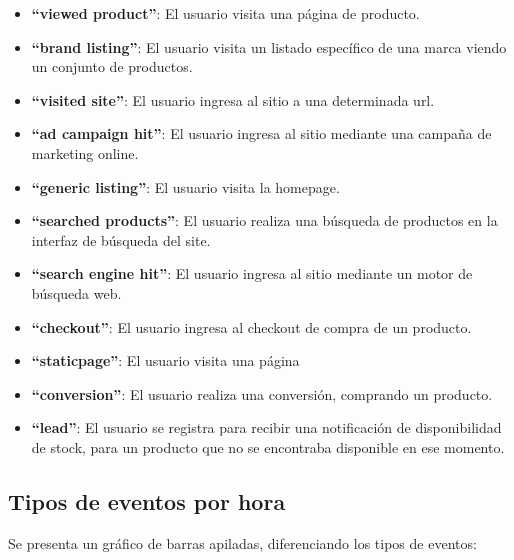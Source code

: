 \documentclass[a4paper ,12pt]{article}
\begin{document}
\begin{itemize}
	
	\item \textbf{“viewed product”}: El usuario visita una página de producto.
	
	\item \textbf{“brand listing”}: El usuario visita un listado específico de una marca viendo un conjunto de productos.
	
	\item \textbf{“visited site”}: El usuario ingresa al sitio a una determinada url.
	
	\item \textbf{“ad campaign hit”}: El usuario ingresa al sitio mediante una campaña de marketing online.
	
	\item \textbf{“generic listing”}: El usuario visita la homepage.
	
	\item \textbf{“searched products”}: El usuario realiza una búsqueda de productos en la interfaz de búsqueda del site.
	
	\item \textbf{“search engine hit”}: El usuario ingresa al sitio mediante un motor de búsqueda web.
	
	\item \textbf{“checkout”}: El usuario ingresa al checkout de compra de un producto.
	
	\item \textbf{“staticpage”}: El usuario visita una página
	
	\item \textbf{“conversion”}: El usuario realiza una conversión, comprando un producto.
	
	\item \textbf{“lead”}: El usuario se registra para recibir una notificación de disponibilidad de stock, para un producto que no se encontraba disponible en ese momento.


\end{itemize}

\newpage

\subsection{Tipos de eventos por hora}

Se presenta un gráfico de barras apiladas, diferenciando los tipos de eventos:\\
\end{document}
